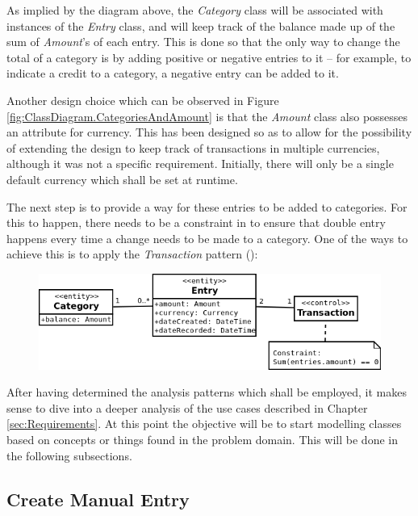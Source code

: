 As implied by the diagram above, the \emph{Category} class will be associated
with instances of the \emph{Entry} class, and will keep track of the balance
made up of the sum of \emph{Amount}'s of each entry. This is done so that the
only way to change the total of a category is by adding positive or negative
entries to it -- for example, to indicate a credit to a category, a negative
entry can be added to it.

Another design choice which can be observed in Figure
\ref{fig:ClassDiagram.CategoriesAndAmount} is that the \emph{Amount} class also
possesses an attribute for currency. This has been designed so as to allow for
the possibility of extending the design to keep track of transactions in
multiple currencies, although it was not a specific requirement. Initially,
there will only be a single default currency which shall be set at runtime.

The next step is to provide a way for these entries to be added to categories.
For this to happen, there needs to be a constraint in to ensure that double
entry happens every time a change needs to be made to a category. One of the
ways to achieve this is to apply the \emph{Transaction} pattern
(\cite[][Section~6.2]{fowler1997analysis}):
\begin{figure}[ht!]
  \begin{center}
    \includegraphics[width=14cm]{./contents/img/Class_Diagram_-_Transaction.png}
  \end{center}
\end{figure}
\FloatBarrier

After having determined the analysis patterns which shall be employed, it makes
sense to dive into a deeper analysis of the use cases described in Chapter
\ref{sec:Requirements}. At this point the objective will be to start modelling
classes based on concepts or things found in the problem domain. This will be
done in the following subsections.

\subsection{Create Manual Entry} \label{sec:AnalysisAndDesign.ManualEntry}

